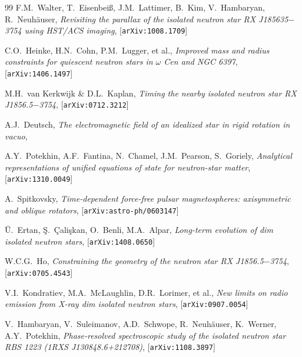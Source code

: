 \documentclass{pos1}
\begin{document}
\begin{thebibliography}{99}
F.M.~Walter, T.~Eisenbei{\ss}, J.M.~Lattimer, B.~Kim, V.~Hambaryan, R.~Neuh\"auser,
\textit{Revisiting the parallax of the isolated neutron star RX J185635$-$3754 using HST/ACS imaging},
[\texttt{arXiv:1008.1709}]


C.O.~Heinke, H.N.~Cohn, P.M.~Lugger, et al.,
\textit{Improved mass and radius constraints for quiescent neutron stars in $\omega$ Cen and NGC 6397},
[\texttt{arXiv:1406.1497}]

M.H.~van Kerkwijk \& D.L.~Kaplan,
\textit{Timing the nearby isolated neutron star RX J1856.5$-$3754},
[\texttt{arXiv:0712.3212}]

A.J.~Deutsch,
\textit{The electromagnetic field of an idealized star in rigid rotation in vacuo},

A.Y.~Potekhin, A.F.~Fantina, N.~Chamel, J.M.~Pearson, S.~Goriely,
\textit{Analytical representations of unified equations of state for neutron-star matter},
[\texttt{arXiv:1310.0049}]

A.~Spitkovsky,
\textit{Time-dependent force-free pulsar magnetospheres: axisymmetric and oblique rotators},
[\texttt{arXiv:astro-ph/0603147}]

\"U.~Ertan, \c{S}.~\c{C}ali\c{s}kan, O.~Benli, M.A.~Alpar,
\textit{Long-term evolution of dim isolated neutron stars},
[\texttt{arXiv:1408.0650}]

W.C.G.~Ho,
\textit{Constraining the geometry of the neutron star RX J1856.5$-$3754},
[\texttt{arXiv:0705.4543}]

V.I.~Kondratiev, M.A.~McLaughlin, D.R.~Lorimer, et al.,
\textit{New limits on radio emission from X-ray dim isolated neutron stars},
[\texttt{arXiv:0907.0054}]

V.~Hambaryan, V.~Suleimanov, A.D.~Schwope, R.~Neuh\"auser, K.~Werner, A.Y.~Pote\-khin,
\textit{Phase-resolved spectroscopic study of the isolated neutron star RBS 1223 (1RXS J130848.6+212708)},
[\texttt{arXiv:1108.3897}]


\end{thebibliography}
\end{document}
